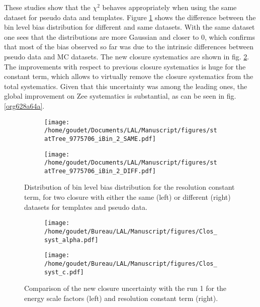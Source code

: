 \begin{enumerate}
These studies show that the $\chi^2$ behaves appropriately when using the same dataset for pseudo data and templates.
Figure \ref{org1646922} shows the difference between the bin level bias distribution for different and same datasets.
With the same dataset one sees that the distributions are more Gaussian and closer to 0, which confirms that most of the bias observed so far was due to the intrinsic differences between pseudo data and MC datasets.
The new closure systematics are shown in fig. \ref{org4b7a948}.
The improvements with respect to previous closure systematics is huge for the constant term, which allows to virtually remove the closure systematics from the total systematics.
Given that this uncertainty was among the leading ones, the global improvement on Zee systematics is substantial, as can be seen in fig. \ref{org628a64a}.




\begin{figure}
\begin{subfigure}[t]{0.49\linewidth}
\texttt{[image: /home/goudet/Documents/LAL/Manuscript/figures/statTree\_9775706\_iBin\_2\_SAME.pdf]}
\end{subfigure}
\begin{subfigure}[t]{0.49\linewidth}
\texttt{[image: /home/goudet/Documents/LAL/Manuscript/figures/statTree\_9775706\_iBin\_2\_DIFF.pdf]}
\end{subfigure}
\caption{\label{org1646922}
Distribution of bin level bias distribution for the resolution constant term, for two closure with either the same (left) or different (right) datasets for templates and pseudo data.}
\end{figure}

\begin{figure}
\begin{subfigure}[t]{0.49\linewidth}
\texttt{[image: /home/goudet/Bureau/LAL/Manuscript/figures/Clos\_syst\_alpha.pdf]}
\end{subfigure}
\begin{subfigure}[t]{0.49\linewidth}
\texttt{[image: /home/goudet/Bureau/LAL/Manuscript/figures/Clos\_syst\_c.pdf]}
\end{subfigure}
\caption{\label{org4b7a948}
Comparison of the new closure uncertainty with the run 1 for the energy scale factors (left) and resolution constant term (right). \cite{170712_Guerguichon}}
\end{figure}




\end{enumerate}
